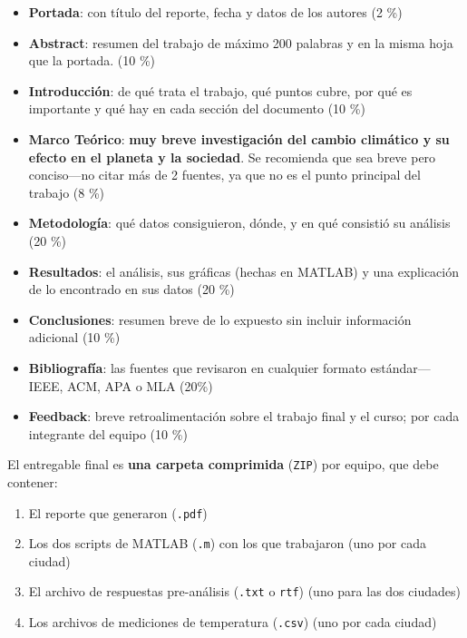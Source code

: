 \documentclass[]{article}
\theoremstyle{definition}
\newcommand{\markthis}[1]{{\color{blue}\textbf{#1}}}
\begin{document}
\begin{itemize}
    \item \textbf{Portada}: con título del reporte, fecha y datos de los autores (2 \%)
    \item \textbf{Abstract}: resumen del trabajo de máximo 200 palabras y en la misma hoja que la portada. (10 \%)
    \item \textbf{Introducción}: de qué trata el trabajo, qué puntos cubre, por qué es importante y qué hay en cada sección del documento (10 \%)
    \item \textbf{Marco Teórico}: \markthis{muy breve investigación del cambio climático y su efecto en el planeta y la sociedad}. Se recomienda que sea breve pero conciso---no citar más de 2 fuentes, ya que no es el punto principal del trabajo (8 \%)
    \item \textbf{Metodología}: qué datos consiguieron, dónde, y en qué consistió su análisis (20 \%)
    \item \textbf{Resultados}: el análisis, sus gráficas (hechas en MATLAB) y una explicación de lo encontrado en sus datos (20 \%)
    \item \textbf{Conclusiones}: resumen breve de lo expuesto sin incluir información adicional (10 \%)
    \item \textbf{Bibliografía}: las fuentes que revisaron en cualquier formato estándar---IEEE, ACM, APA o MLA (20\%)
    \item \textbf{Feedback}: breve retroalimentación sobre el trabajo final y el curso; por cada integrante del equipo (10 \%)
\end{itemize}

\vspace{2 cm}

El entregable final es \textbf{una carpeta comprimida} (\texttt{ZIP}) por equipo, que debe contener:

\begin{enumerate}
    \item El reporte que generaron (\texttt{.pdf})
    \item Los dos scripts de MATLAB (\texttt{.m}) con los que trabajaron (uno por cada ciudad)
    \item El archivo de respuestas pre-análisis (\texttt{.txt} o \texttt{rtf}) (uno para las dos ciudades)
    \item Los archivos de mediciones de temperatura (\texttt{.csv}) (uno por cada ciudad)
\end{enumerate}
\end{document}
